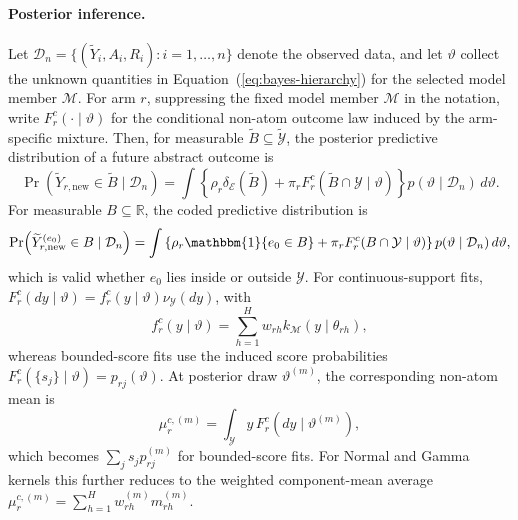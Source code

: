 \documentclass[11pt]{article}
\begin{document}
\paragraph{Posterior inference.}
Let
\(
  \mathcal{D}_n=\{(\widetilde{Y}_i,A_i,R_i):i=1,\ldots,n\}
\)
denote the observed data, and let \(\vartheta\) collect the unknown quantities in Equation~(\ref{eq:bayes-hierarchy}) for the selected model member \(\mathcal M\).
For arm \(r\), suppressing the fixed model member \(\mathcal M\) in the notation, write \(F_r^c(\cdot\mid\vartheta)\) for the conditional non-atom outcome law induced by the arm-specific mixture.
Then, for measurable \(\widetilde B\subseteq\widetilde{\mathcal Y}\), the posterior predictive distribution of a future abstract outcome is
\[
  \Pr\!\left(\widetilde Y_{r,\mathrm{new}}\in\widetilde B\mid\mathcal D_n\right)
  =
  \int
  \left\{
    \rho_r\delta_{\mathcal E}(\widetilde B)
    +\pi_rF_r^c(\widetilde B\cap\mathcal Y\mid\vartheta)
  \right\}
  p(\vartheta\mid\mathcal D_n)\,d\vartheta .
\]
For measurable \(B\subseteq\mathbb R\), the coded predictive distribution is
\[
  \Pr\!\left(\widetilde{Y}_{r,\mathrm{new}}^{(e_0)}\in B\mid\mathcal{D}_n\right)
  =
  \int
  \left\{
    \rho_r\mathbbm{1}\{e_0\in B\}
    +\pi_rF_r^c(B\cap\mathcal Y\mid\vartheta)
  \right\}
  p(\vartheta\mid\mathcal{D}_n)\,d\vartheta,
\]
which is valid whether \(e_0\) lies inside or outside \(\mathcal Y\). For continuous-support fits, \(F_r^c(dy\mid\vartheta)=f_r^c(y\mid\vartheta)\nu_{\mathcal{Y}}(dy)\), with
\[
  f_r^c(y\mid\vartheta)
  = \sum_{h=1}^{H}w_{rh}k_{\mathcal M}(y\mid\theta_{rh}),
\]
whereas bounded-score fits use the induced score probabilities \(F_r^c(\{s_j\}\mid\vartheta)=p_{rj}(\vartheta)\).
At posterior draw \(\vartheta^{(m)}\), the corresponding non-atom mean is
\[
  \mu_r^{c,(m)}
  =
  \int_{\mathcal{Y}} y\,F_r^c(dy\mid\vartheta^{(m)}),
\]
which becomes \(\sum_j s_jp_{rj}^{(m)}\) for bounded-score fits.
For Normal and Gamma kernels this further reduces to the weighted component-mean average
\(
  \mu_r^{c,(m)}=\sum_{h=1}^{H}w_{rh}^{(m)}m_{rh}^{(m)}
\).
\end{document}
